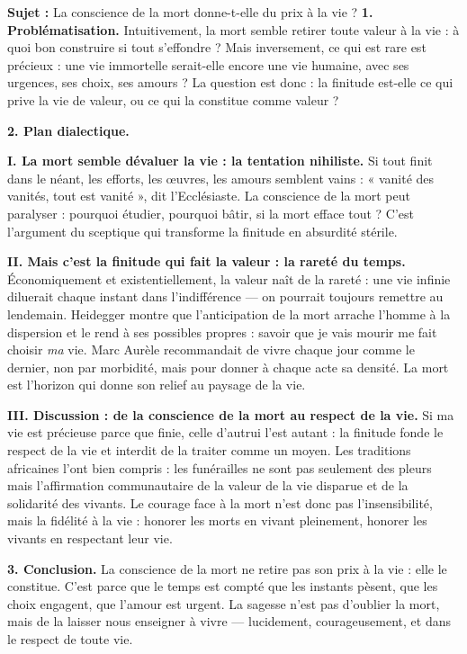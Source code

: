\documentclass[11pt]{article}
\newcommand{\cle}[1]{{\popxbold\color{popdark}#1}}
\begin{document}
\begin{exoresolu}
\textbf{Sujet :} La conscience de la mort donne-t-elle du prix à la vie ?
\tcblower
\textbf{1. Problématisation.} Intuitivement, la mort semble retirer toute valeur à la vie : à quoi bon construire si tout s'effondre ? Mais inversement, ce qui est rare est précieux : une vie immortelle serait-elle encore une vie humaine, avec ses urgences, ses choix, ses amours ? La question est donc : la finitude est-elle ce qui prive la vie de valeur, ou ce qui la constitue comme valeur ?

\textbf{2. Plan dialectique.}

\textbf{I. La mort semble dévaluer la vie : la tentation nihiliste.} Si tout finit dans le néant, les efforts, les œuvres, les amours semblent vains : « vanité des vanités, tout est vanité », dit l'Ecclésiaste. La conscience de la mort peut paralyser : pourquoi étudier, pourquoi bâtir, si la mort efface tout ? C'est l'argument du sceptique qui transforme la finitude en absurdité stérile.

\textbf{II. Mais c'est la finitude qui fait la valeur : la rareté du temps.} Économiquement et existentiellement, la valeur naît de la rareté : une vie infinie diluerait chaque instant dans l'indifférence — on pourrait toujours remettre au lendemain. Heidegger montre que l'anticipation de la mort arrache l'homme à la dispersion et le rend à ses possibles propres : savoir que je vais mourir me fait choisir \emph{ma} vie. Marc Aurèle recommandait de vivre chaque jour comme le dernier, non par morbidité, mais pour donner à chaque acte sa densité. La mort est l'horizon qui donne son relief au paysage de la vie.

\textbf{III. Discussion : de la conscience de la mort au respect de la vie.} Si ma vie est précieuse parce que finie, celle d'autrui l'est autant : la finitude fonde le \cle{respect de la vie} et interdit de la traiter comme un moyen. Les traditions africaines l'ont bien compris : les funérailles ne sont pas seulement des pleurs mais l'affirmation communautaire de la valeur de la vie disparue et de la solidarité des vivants. Le courage face à la mort n'est donc pas l'insensibilité, mais la fidélité à la vie : honorer les morts en vivant pleinement, honorer les vivants en respectant leur vie.

\textbf{3. Conclusion.} La conscience de la mort ne retire pas son prix à la vie : elle le constitue. C'est parce que le temps est compté que les instants pèsent, que les choix engagent, que l'amour est urgent. La sagesse n'est pas d'oublier la mort, mais de la laisser nous enseigner à vivre — lucidement, courageusement, et dans le respect de toute vie.
\end{exoresolu}
\end{document}
